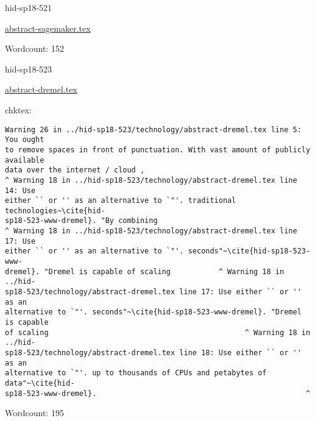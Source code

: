 

\begin{IU}

hid-sp18-521

\href{https://github.com/cloudmesh-community/hid-sp18-521/blob/master//technology/abstract-sagemaker.tex}{abstract-sagemaker.tex}

 

Wordcount: 152

\end{IU}



\begin{IU}

hid-sp18-523

\href{https://github.com/cloudmesh-community/hid-sp18-523/blob/master//technology/abstract-dremel.tex}{abstract-dremel.tex}

 
chktex:
\begin{tiny}
\begin{verbatim}
Warning 26 in ../hid-sp18-523/technology/abstract-dremel.tex line 5: You ought
to remove spaces in front of punctuation. With vast amount of publicly available
data over the internet / cloud ,
^ Warning 18 in ../hid-sp18-523/technology/abstract-dremel.tex line 14: Use
either `` or '' as an alternative to `"'. traditional technologies~\cite{hid-
sp18-523-www-dremel}. "By combining
^ Warning 18 in ../hid-sp18-523/technology/abstract-dremel.tex line 17: Use
either `` or '' as an alternative to `"'. seconds"~\cite{hid-sp18-523-www-
dremel}. "Dremel is capable of scaling           ^ Warning 18 in ../hid-
sp18-523/technology/abstract-dremel.tex line 17: Use either `` or '' as an
alternative to `"'. seconds"~\cite{hid-sp18-523-www-dremel}. "Dremel is capable
of scaling                                             ^ Warning 18 in ../hid-
sp18-523/technology/abstract-dremel.tex line 18: Use either `` or '' as an
alternative to `"'. up to thousands of CPUs and petabytes of data"~\cite{hid-
sp18-523-www-dremel}.                                                ^
\end{verbatim}
\end{tiny}

Wordcount: 195

\end{IU}



